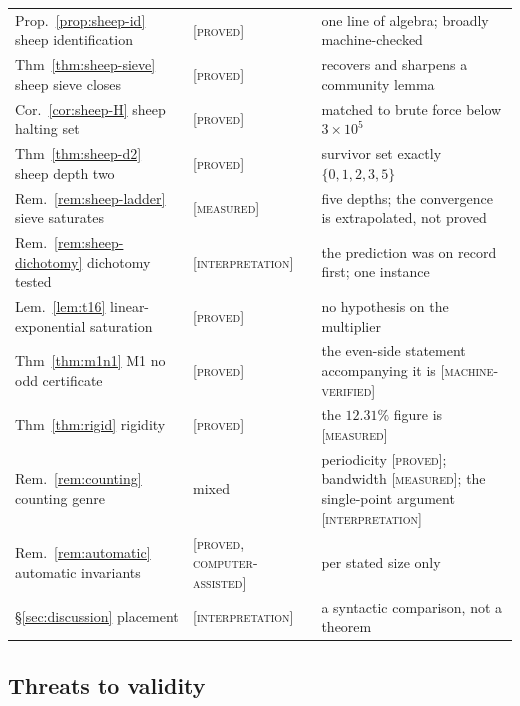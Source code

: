 \documentclass[11pt]{article}
\theoremstyle{definition}
\theoremstyle{remark}
\newcommand{\Proved}{\textsc{[proved]}}
\newcommand{\CAP}{\textsc{[proved, computer-assisted]}}
\newcommand{\MV}{\textsc{[machine-verified]}}
\newcommand{\Meas}{\textsc{[measured]}}
\newcommand{\Interp}{\textsc{[interpretation]}}
\begin{document}
\begin{center}
\begin{tabular}{@{}llp{6.4cm}@{}}
Prop.~\ref{prop:sheep-id} sheep identification & \Proved & one line of algebra;
  broadly machine-checked \\
Thm~\ref{thm:sheep-sieve} sheep sieve closes & \Proved & recovers and sharpens
  a community lemma \\
Cor.~\ref{cor:sheep-H} sheep halting set & \Proved & matched to brute force
  below $3\times10^5$ \\
Thm~\ref{thm:sheep-d2} sheep depth two & \Proved & survivor set exactly
  $\{0,1,2,3,5\}$ \\
Rem.~\ref{rem:sheep-ladder} sieve saturates & \Meas & five depths; the
  convergence is extrapolated, not proved \\
Rem.~\ref{rem:sheep-dichotomy} dichotomy tested & \Interp & the prediction was
  on record first; one instance \\
Lem.~\ref{lem:t16} linear-exponential saturation & \Proved & no hypothesis on
  the multiplier \\
Thm~\ref{thm:m1n1} M1 no odd certificate & \Proved & the even-side statement
  accompanying it is \MV \\
Thm~\ref{thm:rigid} rigidity & \Proved & the $12.31\%$ figure is \Meas \\
Rem.~\ref{rem:counting} counting genre & mixed & periodicity \Proved{};
  bandwidth \Meas{}; the single-point argument \Interp \\
Rem.~\ref{rem:automatic} automatic invariants & \CAP & per stated size only \\
\S\ref{sec:discussion} placement & \Interp & a syntactic comparison, not a
  theorem \\
\bottomrule
\end{tabular}
\end{center}

\subsection{Threats to validity}
\label{sec:threats}
\end{document}
